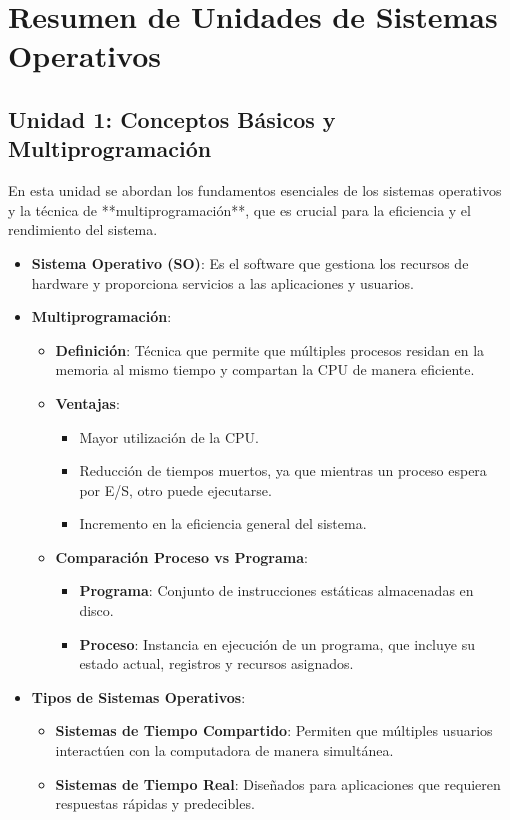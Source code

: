 \section{Resumen de Unidades de Sistemas Operativos}

\subsection{Unidad 1: Conceptos Básicos y Multiprogramación}
En esta unidad se abordan los fundamentos esenciales de los sistemas operativos y la técnica de **multiprogramación**, que es crucial para la eficiencia y el rendimiento del sistema.

\begin{itemize}
	\item \textbf{Sistema Operativo (SO)}: Es el software que gestiona los recursos de hardware y proporciona servicios a las aplicaciones y usuarios.
	
	\item \textbf{Multiprogramación}: 
	\begin{itemize}
		\item \textbf{Definición}: Técnica que permite que múltiples procesos residan en la memoria al mismo tiempo y compartan la CPU de manera eficiente.
		\item \textbf{Ventajas}:
		\begin{itemize}
			\item Mayor utilización de la CPU.
			\item Reducción de tiempos muertos, ya que mientras un proceso espera por E/S, otro puede ejecutarse.
			\item Incremento en la eficiencia general del sistema.
		\end{itemize}
		\item \textbf{Comparación Proceso vs Programa}: 
		\begin{itemize}
			\item \textbf{Programa}: Conjunto de instrucciones estáticas almacenadas en disco.
			\item \textbf{Proceso}: Instancia en ejecución de un programa, que incluye su estado actual, registros y recursos asignados.
		\end{itemize}
	\end{itemize}
	
	\item \textbf{Tipos de Sistemas Operativos}:
	\begin{itemize}
		\item \textbf{Sistemas de Tiempo Compartido}: Permiten que múltiples usuarios interactúen con la computadora de manera simultánea.
		\item \textbf{Sistemas de Tiempo Real}: Diseñados para aplicaciones que requieren respuestas rápidas y predecibles.
	\end{itemize}
\end{itemize}

